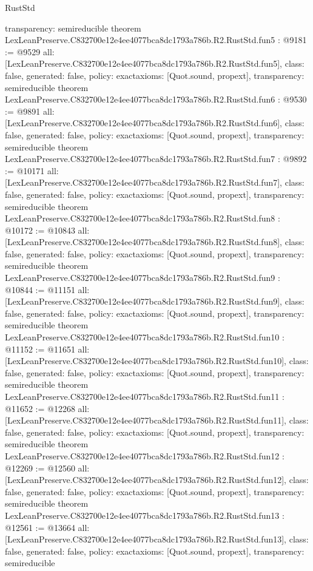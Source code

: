 \begin{lexlean}{RustStd}
\begin{coremodule}
{  transparency: semireducible
}
theorem LexLeanPreserve.C832700e12e4ee4077bca8dc1793a786b.R2.RustStd.fun5 : @9181 := @9529 {
  all: [LexLeanPreserve.C832700e12e4ee4077bca8dc1793a786b.R2.RustStd.fun5],
  class: false,
  generated: false,
  policy: exact{axioms: [Quot.sound, propext]},
  transparency: semireducible
}
theorem LexLeanPreserve.C832700e12e4ee4077bca8dc1793a786b.R2.RustStd.fun6 : @9530 := @9891 {
  all: [LexLeanPreserve.C832700e12e4ee4077bca8dc1793a786b.R2.RustStd.fun6],
  class: false,
  generated: false,
  policy: exact{axioms: [Quot.sound, propext]},
  transparency: semireducible
}
theorem LexLeanPreserve.C832700e12e4ee4077bca8dc1793a786b.R2.RustStd.fun7 : @9892 := @10171 {
  all: [LexLeanPreserve.C832700e12e4ee4077bca8dc1793a786b.R2.RustStd.fun7],
  class: false,
  generated: false,
  policy: exact{axioms: [Quot.sound, propext]},
  transparency: semireducible
}
theorem LexLeanPreserve.C832700e12e4ee4077bca8dc1793a786b.R2.RustStd.fun8 : @10172 := @10843 {
  all: [LexLeanPreserve.C832700e12e4ee4077bca8dc1793a786b.R2.RustStd.fun8],
  class: false,
  generated: false,
  policy: exact{axioms: [Quot.sound, propext]},
  transparency: semireducible
}
theorem LexLeanPreserve.C832700e12e4ee4077bca8dc1793a786b.R2.RustStd.fun9 : @10844 := @11151 {
  all: [LexLeanPreserve.C832700e12e4ee4077bca8dc1793a786b.R2.RustStd.fun9],
  class: false,
  generated: false,
  policy: exact{axioms: [Quot.sound, propext]},
  transparency: semireducible
}
theorem LexLeanPreserve.C832700e12e4ee4077bca8dc1793a786b.R2.RustStd.fun10 : @11152 := @11651 {
  all: [LexLeanPreserve.C832700e12e4ee4077bca8dc1793a786b.R2.RustStd.fun10],
  class: false,
  generated: false,
  policy: exact{axioms: [Quot.sound, propext]},
  transparency: semireducible
}
theorem LexLeanPreserve.C832700e12e4ee4077bca8dc1793a786b.R2.RustStd.fun11 : @11652 := @12268 {
  all: [LexLeanPreserve.C832700e12e4ee4077bca8dc1793a786b.R2.RustStd.fun11],
  class: false,
  generated: false,
  policy: exact{axioms: [Quot.sound, propext]},
  transparency: semireducible
}
theorem LexLeanPreserve.C832700e12e4ee4077bca8dc1793a786b.R2.RustStd.fun12 : @12269 := @12560 {
  all: [LexLeanPreserve.C832700e12e4ee4077bca8dc1793a786b.R2.RustStd.fun12],
  class: false,
  generated: false,
  policy: exact{axioms: [Quot.sound, propext]},
  transparency: semireducible
}
theorem LexLeanPreserve.C832700e12e4ee4077bca8dc1793a786b.R2.RustStd.fun13 : @12561 := @13664 {
  all: [LexLeanPreserve.C832700e12e4ee4077bca8dc1793a786b.R2.RustStd.fun13],
  class: false,
  generated: false,
  policy: exact{axioms: [Quot.sound, propext]},
  transparency: semireducible
}
\end{coremodule}
\end{lexlean}
